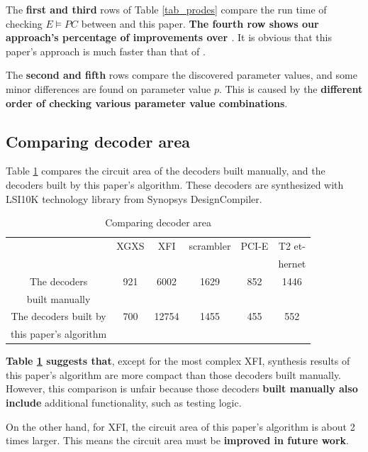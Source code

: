 \documentclass[journal]{IEEEtran}
\begin{document}
The \textbf{first and third} rows of Table \ref{tab_prodes} compare the run time of checking $E\vDash PC$ between \cite{ShengYuShen:fmcad10} and this paper.
\textbf{The fourth row shows our approach's percentage of improvements over \cite{ShengYuShen:fmcad10}}.
It is obvious that this paper's approach is much faster than that of \cite{ShengYuShen:fmcad10}.

The \textbf{second and fifth} rows compare the discovered parameter values,
and some minor differences are found on parameter value $p$.
This is caused by the \textbf{different order of checking various parameter value combinations}.

\subsection{Comparing decoder area}\label{subsec_area}

Table \ref{tab_cmparea} compares the circuit area of the decoders built manually,
and the decoders built by this paper's algorithm.
These decoders are synthesized with LSI10K technology library from Synopsys DesignCompiler.

\begin{table}[t]
\centering
\caption{Comparing decoder area}
\begin{tabular}{|c|c|c|c|c|c|}
\hline
                   &XGXS      &XFI       &scrambler    &PCI-E  &T2 et-\\
&&&&&hernet\\ \hline
The decoders       &921       &6002      &1629         &852   &1446          \\
built manually           &&&&&\\ \hline
The decoders built by      &700       &12754     &1455         &455   &552          \\
this paper's algorithm   &&&&&\\ \hline
\end{tabular}\label{tab_cmparea}
\end{table}

\textbf{Table \ref{tab_cmparea} suggests that},
except for the most complex XFI, synthesis results of this paper's algorithm
are more compact than those decoders built manually. However,
this comparison is unfair because those decoders \textbf{built manually also include} additional functionality,
such as testing logic.

On the other hand,
for XFI,
the circuit area of this paper's algorithm is about 2 times larger.
This means the circuit area must be \textbf{improved in future work}.
\end{document}
